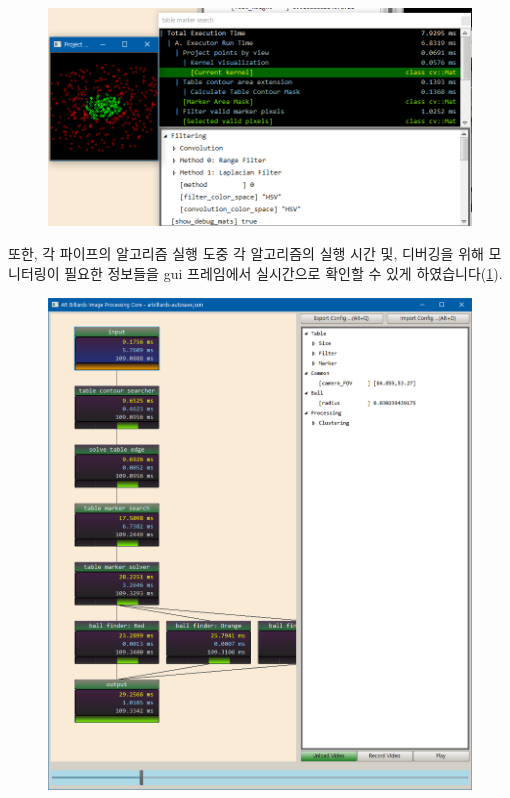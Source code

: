 \documentclass[10pt]{oblivoir}
\begin{document}
\begin{figure}[ht]
    \centering
    \includegraphics[width=15cm]{img/pipe-view.png}
    \caption{}
    \label{fig;pipe-view}
\end{figure}

또한, 각 파이프의 알고리즘 실행 도중 각 알고리즘의 실행 시간 및, 디버깅을 위해 모니터링이 필요한 정보들을 gui 프레임에서 실시간으로 확인할 수 있게 하였습니다(\cref{fig;pipe-view}). 

\begin{figure}[H]
    \centering
    \includegraphics[width=18cm]{img/interface.png}
    \caption{}
    \label{fig;interface}
\end{figure}
\end{document}
